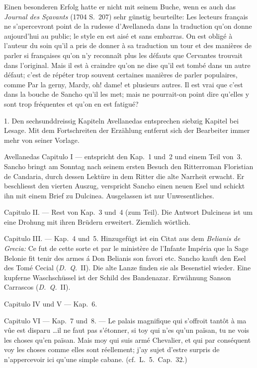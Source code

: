 Einen besonderen Erfolg hatte er nicht mit seinem Buche, wenn
es auch das {\it Journal des Sçavants} (1704 S.~207) sehr günstig beurteilte:
{\itquoted\french Les lecteurs français ne s'apercevront point de la rudesse d'Avellaneda
dans la traduction qu'on donne aujourd'hui au public; le style en
est aisé et sans embarras. On est obligé à l'auteur du soin qu'il a
pris de donner à sa traduction un tour et des manières de parler si
françaises qu'on n'y reconnaît plus les défauts que Cervantes trouvait
dans l'original. Mais il est à craindre qu'on ne dise qu'il est tombé
dans un autre défaut; c'est de répéter trop souvent certaines manières
de parler populaires, comme Par la gerny, Mardy, oh! dame! et
plusieurs autres. Il est vrai que c'est dans la bouche de Sancho qu'il
les met; mais ne pourrait-on point dire qu'elles y sont trop fréquentes
et qu'on en est fatigué?}

1. Den sechsunddreissig Kapiteln Avellanedas entsprechen siebzig
Kapitel bei Lesage. Mit dem Fortschreiten der Erzählung entfernt sich
der Bearbeiter immer mehr von seiner Vorlage.

Avellanedas Capitulo I --- entspricht den Kap.~1 und~2 und einem
Teil von~3. Sancho bringt am Sonntag nach seinem ersten Besuch den
Ritterroman Floristian de Candaria, durch dessen Lektüre in dem Ritter
die alte Narrheit erwacht. Er beschliesst den vierten Auszug, verspricht
Sancho einen neuen Esel und schickt ihn mit einem Brief zu Dulcinea.
Ausgelassen ist nur Unwesentliches.

Capitulo II. --- Rest von Kap.~3 und~4 (zum Teil). Die Antwort
Dulcineas ist um eine Drohung mit ihren Brüdern erweitert. Ziemlich
wörtlich.

Capitulo III. --- Kap.~4 und~5. Hinzugefügt ist ein Citat aus dem
{\it Belianis de Grecia:} {\itquoted\french Ce fut de cette sorte et par le ministère de
l'Infante Impéria que la Sage Belonie fit tenir des armes á Don
Belianis son favori} etc. Sancho kauft den Esel des Tomé Cecial
({\it D.~Q.}~II). Die alte Lanze finden sie als Besenstiel wieder. Eine
kupferne Waschschüssel ist der {\quoted Schild des Bandenazar}. Erwähnung
Sanson Carrascos ({\it D.~Q.}~II).

Capitulo IV und V --- Kap.~6.

Capitulo VI --- Kap.~7 und~8. --- {\itquoted\french Le palais magnifique qui
s'offroit tantôt à ma vûe est disparu \dots il ne faut pas s'étonner, si
toy qui n'es qu'un païsan, tu ne vois les choses qu'en païsan. Mais
moy qui suis armé Chevalier, et qui par conséquent voy les choses comme
elles sont réellement; j'ay sujet d'estre surpris de n'appercevoir ici
qu'une simple cabane.} (cf.~L.~5.~Cap.~32.)

